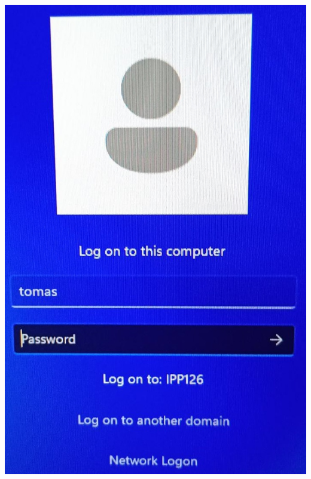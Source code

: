 \documentclass[fleqn,a4paper,20pt]{article}
\begin{document}
\begin{minipage}{.3\textwidth}
\centering
\includegraphics[width=0.6\linewidth]{PC2}
\label{PC1}
\end{minipage}

\vspace{0.6cm}
\end{document}
